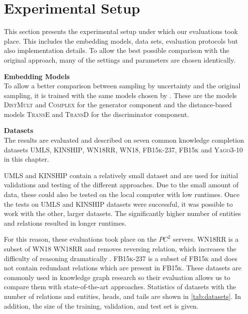 \section{Experimental Setup}
\label{ch:evaluation:sec:experimental_setup}
%
This section presents the experimental setup under which our evaluations took place.
This includes the embedding models, data sets, evaluation protocols but also implementation details.
To allow the best possible comparison with the original \kbgan approach, many of the settings and parameters are chosen identically.

\textbf{Embedding Models}\\
To allow a better comparison between sampling by uncertainty and the original sampling, it is trained with the same models chosen by \kbgan.
These are the models \textsc{DistMult} and \textsc{Complex} for the generator component and the distance-based models \textsc{TransE} and \textsc{TransD} for the discriminator component.

\textbf{Datasets}\\
The results are evaluated and described on seven common knowledge completion datasets  \textsc{UMLS}, \textsc{KINSHIP}, \textsc{WN18RR}, \textsc{WN18}, \textsc{FB15k-237}, \textsc{FB15k} and \textsc{Yago3-10} in this chapter.

\textsc{UMLS} and \textsc{KINSHIP} contain a relatively small dataset and are used for initial validations and testing of the different approaches.
Due to the small amount of data, these could also be tested on the local computer with low runtimes.
Once the tests on \textsc{UMLS} and \textsc{KINSHIP} datasets were successful, it was possible to work with the other, larger datasets.
The significantly higher number of entities and relations resulted in longer runtimes.

For this reason, these evaluations took place on the $PC^2$ servers.
\textsc{WN18RR} is a subset of \textsc{WN18} \textsc{WN18RR} and removes reversing relation, which increases the difficulty of reasoning dramatically \cite{cai2017kbgan}.
\textsc{FB15k-237} is a subset of \textsc{FB15k} and does not contain redundant relations which are present in \textsc{FB15k}.
These datasets are commonly used in knowledge graph research so their evaluation allows us to compare them with state-of-the-art approaches.
Statistics of datasets with the number of relations and entities, heads, and tails are shown in \autoref{tab:datasets}. 
In addition, the size of the training, validation, and test set is given.
        
